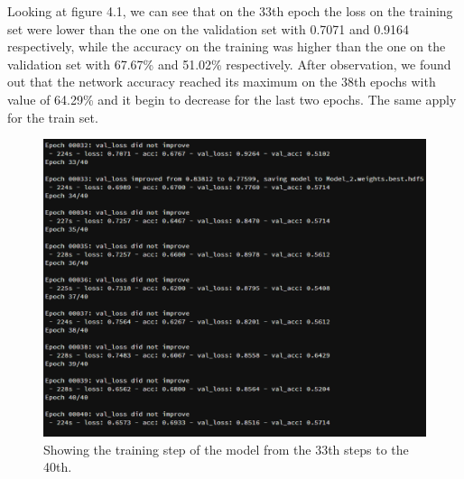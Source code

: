 Looking at figure 4.1, we can see that on the 33th  epoch the loss on the training set were lower than the one on the validation set with 0.7071 and 0.9164 respectively, while the accuracy on the training was higher than the one on the validation set with 67.67\% and 51.02\% respectively.
After observation, we found out that the network accuracy reached its maximum on the 38th epochs with value of 64.29\% and it begin to decrease for the last two epochs. The same apply for the train set.\\
\begin{figure}[ht]
    \centering
    \includegraphics{Figures/tp}
    \decoRule
    \caption [Showing the training step of the model from the 33th steps to the 40th.]{Showing the training step of the model from the 33th steps to the 40th.}
    \label{fig:la}
    \end{figure}\hfill \\

